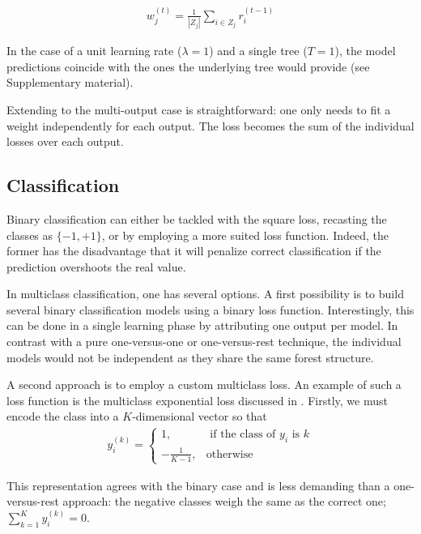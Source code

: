 \documentclass{article}
\begin{document}
\vspace*{-\baselineskip}
\begin{align}\label{eq:L2Solution}
w_j^{(t)} = \frac{1}{|Z_j|} \sum_{i \in Z_j} r_i^{(t-1)}
\end{align}
\vspace*{-\baselineskip}

In the case of a unit learning rate ($\lambda = 1$) and a single tree ($T=1$), 
the model predictions coincide with the ones the underlying tree would provide 
(see Supplementary material).

Extending to the multi-output case is straightforward: one only needs to fit a 
weight independently for each output. The loss becomes the sum of the 
individual losses over each output.

\subsection{Classification}
\label{subsec:classification}

Binary classification can either be tackled with the square loss, recasting the 
classes as $\{-1, +1\}$, or by employing a more suited loss function. Indeed, 
the former has the disadvantage that it will penalize correct classification if 
the prediction overshoots the real value.

In multiclass classification, one has several options. A first possibility is 
to build several binary classification models using a binary loss function. 
Interestingly, this can be done in a single learning phase by attributing one 
output per model. In contrast with a pure one-versus-one or one-versus-rest 
technique, the individual models would not be independent as they share the 
same forest structure.

A second approach is to employ a custom multiclass loss. An example of such a 
loss function is the multiclass exponential loss discussed in 
\cite{zhu2009multiadaboost}. Firstly, we must encode the class into a 
$K$-dimensional vector so that
\begin{align}\label{eq:MEencode}
y_i^{(k)} = \begin{cases}
1, &\text{ if the class of } y_i \text{ is } k \\
-\frac{1}{K-1}, &\text{otherwise}
\end{cases}
\end{align}
\vspace*{-\baselineskip}

This representation agrees with the binary case and is less demanding than a 
one-versus-rest approach: the negative classes weigh the same as the correct 
one; $\sum_{k=1}^{K} y_i^{(k)} = 0$.
\end{document}
